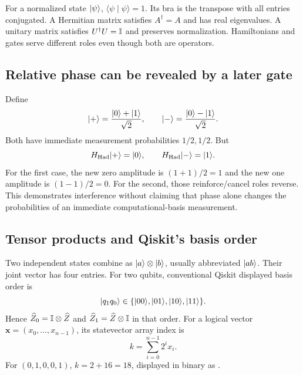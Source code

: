 For a normalized state $\lvert \psi\rangle$, $\langle\psi\mid\psi\rangle=1$. Its bra is
the transpose with all entries conjugated. A Hermitian matrix satisfies
$A^\dagger=A$ and has real eigenvalues. A unitary matrix satisfies
$U^\dagger U=\mathbb{I}$ and preserves normalization. Hamiltonians and gates serve
different roles even though both are operators.

\subsection{Relative phase can be revealed by a later gate}
Define
\begin{equation}
\lvert +\rangle=\frac{\lvert 0\rangle+\lvert 1\rangle}{\sqrt2},\qquad
\lvert -\rangle=\frac{\lvert 0\rangle-\lvert 1\rangle}{\sqrt2}.
\end{equation}
Both have immediate measurement probabilities $1/2,1/2$. But
\begin{equation}
H_{\mathrm{Had}}\lvert +\rangle=\lvert 0\rangle,\qquad
H_{\mathrm{Had}}\lvert -\rangle=\lvert 1\rangle.
\end{equation}
For the first case, the new zero amplitude is $(1+1)/2=1$ and the new one
amplitude is $(1-1)/2=0$. For the second, those reinforce/cancel roles reverse.
This demonstrates interference without claiming that phase alone changes the
probabilities of an immediate computational-basis measurement.

\subsection{Tensor products and Qiskit's basis order}
Two independent states combine as $\lvert a\rangle\otimes\lvert b\rangle$, usually abbreviated
$\lvert ab\rangle$. Their joint vector has four entries. For two qubits, conventional
Qiskit displayed basis order is
\begin{equation}
\lvert q_1q_0\rangle\in\{\lvert 00\rangle,\lvert 01\rangle,\lvert 10\rangle,\lvert 11\rangle\}.
\end{equation}
Hence $\widehat Z_0=\mathbb{I}\otimes\widehat Z$ and
$\widehat Z_1=\widehat Z\otimes\mathbb{I}$ in that order. For a logical vector
$\boldsymbol{x}=(x_0,\ldots,x_{n-1})$, its statevector array index is
\begin{equation}
k=\sum_{i=0}^{n-1}2^i x_i.
\end{equation}
For $(0,1,0,0,1)$, $k=2+16=18$, displayed in binary as .

